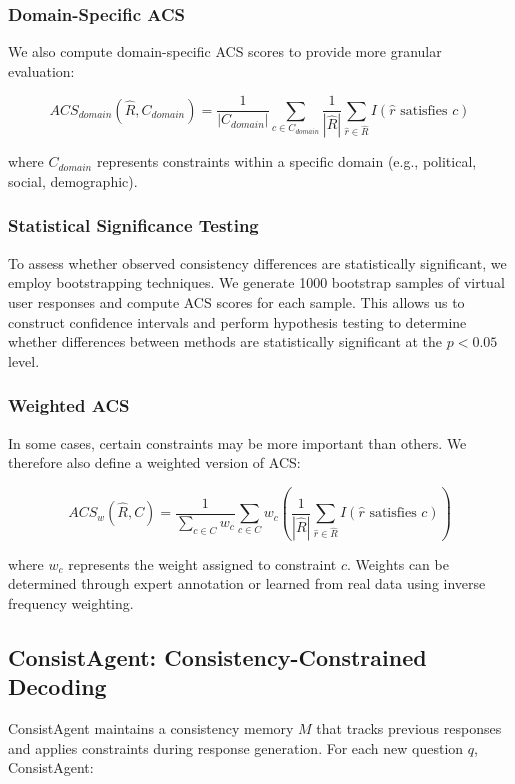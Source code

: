 \documentclass[sigconf, anonymous]{acmart}
\begin{document}
\subsubsection{Domain-Specific ACS}

We also compute domain-specific ACS scores to provide more granular evaluation:

\[
ACS_{domain}(\hat{R}, C_{domain}) = \frac{1}{|C_{domain}|} \sum_{c \in C_{domain}} \frac{1}{|\hat{R}|} \sum_{\hat{r} \in \hat{R}} I(\hat{r} \text{ satisfies } c)
\]

where $C_{domain}$ represents constraints within a specific domain (e.g., political, social, demographic).

\subsubsection{Statistical Significance Testing}

To assess whether observed consistency differences are statistically significant, we employ bootstrapping techniques. We generate 1000 bootstrap samples of virtual user responses and compute ACS scores for each sample. This allows us to construct confidence intervals and perform hypothesis testing to determine whether differences between methods are statistically significant at the $p < 0.05$ level.

\subsubsection{Weighted ACS}

In some cases, certain constraints may be more important than others. We therefore also define a weighted version of ACS:

\[
ACS_w(\hat{R}, C) = \frac{1}{\sum_{c \in C} w_c} \sum_{c \in C} w_c \left( \frac{1}{|\hat{R}|} \sum_{\hat{r} \in \hat{R}} I(\hat{r} \text{ satisfies } c) \right)
\]

where $w_c$ represents the weight assigned to constraint $c$. Weights can be determined through expert annotation or learned from real data using inverse frequency weighting.

\subsection{ConsistAgent: Consistency-Constrained Decoding}

ConsistAgent maintains a consistency memory $M$ that tracks previous responses and applies constraints during response generation. For each new question $q$, ConsistAgent:
\end{document}
